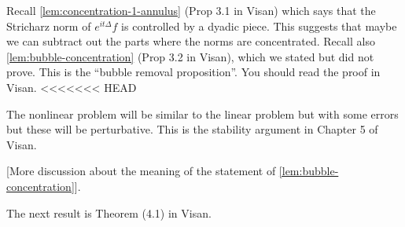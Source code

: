 \documentclass{article}
\begin{document}
Recall \cref{lem:concentration-1-annulus} (Prop 3.1 in Visan) which says that
the Stricharz norm of $e^{it\Delta}f$ is controlled by a dyadic piece. This
suggests that maybe we can subtract out the parts where the norms are
concentrated. Recall also \cref{lem:bubble-concentration} (Prop 3.2 in Visan),
which we stated but did not prove. This is the ``bubble removal proposition''. You should read the proof in Visan.
<<<<<<< HEAD

The nonlinear problem will be similar to the linear problem but with some errors
but these will be perturbative. This is the stability argument in Chapter 5 of
Visan.

[More discussion about the meaning of the statement of
\cref{lem:bubble-concentration}].

The next result is Theorem (4.1) in Visan.
\end{document}
